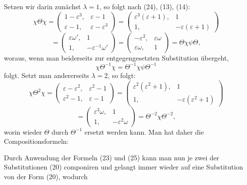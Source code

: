 Setzen wir darin zunächst $\lambda=1$, so folgt nach (24), (13), (14):
\[
\chi\Theta\chi = \begin{pmatrix} 1-\varepsilon^3, & \varepsilon-1 \\ \varepsilon-1, & \varepsilon-\varepsilon^3 \end{pmatrix}
= \begin{pmatrix} \varepsilon^3(\varepsilon+1), & 1 \\ 1, & -\varepsilon(\varepsilon+1) \end{pmatrix}
\]
\[
= \begin{pmatrix} \varepsilon\omega', & 1 \\ 1, & -\varepsilon^{-1}\omega' \end{pmatrix}
= \begin{pmatrix} -\varepsilon^2, & \varepsilon\omega \\ \varepsilon\omega, & 1 \end{pmatrix}
= \Theta\chi\psi\Theta,
\]
woraus, wenn man beiderseits zur entgegengesetzten Substitution übergeht,
\[
\chi\Theta^{-1}\chi = \Theta^{-1}\chi\psi\Theta^{-1}
\]
folgt. Setzt man andererseits $\lambda=2$, so folgt:
\[
\chi\Theta^2\chi = \begin{pmatrix} \varepsilon-\varepsilon^2, & \varepsilon^2-1 \\ \varepsilon^2-1, & \varepsilon-1 \end{pmatrix}
= \begin{pmatrix} \varepsilon^2(\varepsilon^2+1), & 1 \\ 1, & -\varepsilon(\varepsilon^2+1) \end{pmatrix}
\]
\[
= \begin{pmatrix} \varepsilon^3\omega, & 1 \\ 1, & -\varepsilon^2\omega \end{pmatrix}
= \Theta^{-2}\chi\Theta^{-2},
\]
worin wieder $\Theta$ durch $\Theta^{-1}$ ersetzt werden kann. Man hat daher die Compositionsformeln:


Durch Anwendung der Formeln (23) und (25) kann man nun je zwei der Substitutionen (20) componiren und gelangt immer wieder auf eine Substitution von der Form (20), wodurch
